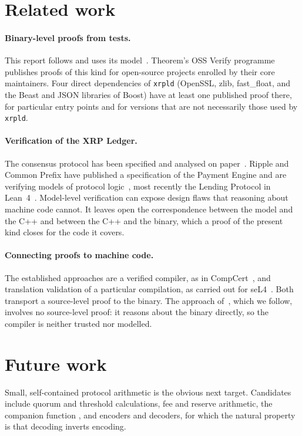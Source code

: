\documentclass[11pt,a4paper]{article}
\newcommand{\code}[1]{\texttt{\upshape\detokenize{#1}}}
\theoremstyle{definition}
\begin{document}
\section{Related work}

\paragraph{Binary-level proofs from tests.} This report follows
\cite{anthropic} and uses its model~\cite{lps}. Theorem's OSS Verify
programme~\cite{ossverify} publishes proofs of this kind for open-source
projects enrolled by their core maintainers. Four direct dependencies of
\texttt{xrpld} (OpenSSL, zlib, fast\_float, and the Beast and JSON libraries
of Boost) have at least one published proof there, for particular entry
points and for versions that are not necessarily those used by
\texttt{xrpld}.

\paragraph{Verification of the XRP Ledger.} The consensus protocol has been
specified and analysed on paper~\cite{rpca,chase}. Ripple and Common Prefix
have published a specification of the Payment Engine and are verifying
models of protocol logic~\cite{ripplex}, most recently the Lending Protocol
in Lean~4~\cite{cryptoslate}. Model-level verification can expose design
flaws that reasoning about machine code cannot. It leaves open the
correspondence between the model and the C++ and between the C++ and the
binary, which a proof of the present kind closes for the code it covers.

\paragraph{Connecting proofs to machine code.} The established approaches
are a verified compiler, as in CompCert~\cite{compcert}, and translation
validation of a particular compilation, as carried out for
seL4~\cite{sewell}. Both transport a source-level proof to the binary. The
approach of~\cite{anthropic}, which we follow, involves no source-level
proof: it reasons about the binary directly, so the compiler is neither
trusted nor modelled.

\section{Future work}

Small, self-contained protocol arithmetic is the obvious next target.
Candidates include quorum and threshold calculations, fee and reserve
arithmetic, the companion function \code{getNextLedgerTimeResolution}, and
encoders and decoders, for which the natural property is that decoding
inverts encoding.
\end{document}
